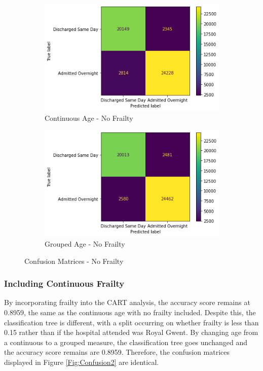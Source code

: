 \documentclass[../thesis.tex]{subfiles}
\begin{document}
\begin{figure}[h!]
\centering
\begin{subfigure}{.5\textwidth}
  \centering
  \includegraphics[width=1\linewidth]{Chapter4/Figures/FIG4AA.png}
  \caption{Continuous Age - No Frailty}
  \label{Fig:Confusion1a}
\end{subfigure}%
\begin{subfigure}{.5\textwidth}
  \centering
  \includegraphics[width=1\linewidth]{Chapter4/Figures/FIG4BA.png}
  \caption{Grouped Age - No Frailty}
  \label{Fig:Confusion1b}
\end{subfigure}
\caption{Confusion Matrices - No Frailty}
\label{Fig:Confusion1}
\end{figure}

\subsubsection{Including Continuous Frailty}
By incorporating frailty into the CART analysis, the accuracy score remains at 0.8959, the same as the continuous age with no frailty included. Despite this, the classification tree is different, with a split occurring on whether frailty is less than 0.15 rather than if the hospital attended was Royal Gwent. By changing age from a continuous to a grouped measure, the classification tree goes unchanged and the accuracy score remains are 0.8959. Therefore, the confusion matrices displayed in Figure \ref{Fig:Confusion2} are identical.
\end{document}
